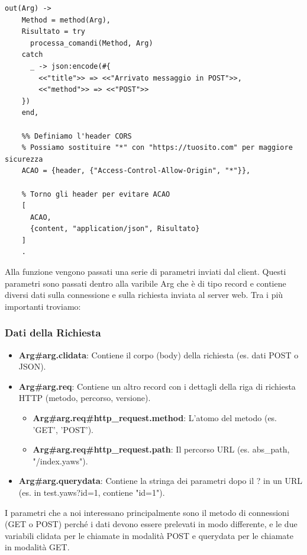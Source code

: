 \begin{verbatim}
out(Arg) ->
    Method = method(Arg),
    Risultato = try
      processa_comandi(Method, Arg)
    catch
      _ -> json:encode(#{
        <<"title">> => <<"Arrivato messaggio in POST">>,
        <<"method">> => <<"POST">>
    })
    end,
    
    %% Definiamo l'header CORS
    % Possiamo sostituire "*" con "https://tuosito.com" per maggiore sicurezza
    ACAO = {header, {"Access-Control-Allow-Origin", "*"}},
    
    % Torno gli header per evitare ACAO
    [
      ACAO,
      {content, "application/json", Risultato}
    ]
    .
\end{verbatim} 

Alla funzione vengono passati una serie di parametri inviati dal client. Questi parametri sono passati dentro alla varibile Arg che \`e di tipo record e contiene diversi dati sulla connessione e sulla richiesta inviata al server web. Tra i pi\`u importanti troviamo:

\subsubsection{Dati della Richiesta}
\begin{itemize}
    \item \textbf{Arg\#arg.clidata}: Contiene il corpo (body) della richiesta (es. dati POST o JSON).   
    \item \textbf{Arg\#arg.req}: Contiene un altro record con i dettagli della riga di richiesta HTTP (metodo, percorso, versione).
    \begin{itemize}
        \item \textbf{Arg\#arg.req\#http\_request.method}: L'atomo del metodo (es. 'GET', 'POST').
        \item \textbf{Arg\#arg.req\#http\_request.path}: Il percorso URL (es. {abs\_path, "/index.yaws"}).
    \end{itemize}
    \item \textbf{Arg\#arg.querydata}: Contiene la stringa dei parametri dopo il ? in un URL (es. in test.yaws?id=1, contiene "id=1").
\end{itemize}

I parametri che a noi interessano principalmente sono il metodo di connessioni (GET o POST) perch\'e i dati devono essere prelevati in modo differente, e le due variabili clidata per le chiamate in modalit\`a POST e querydata per le chiamate in modalit\`a GET.

